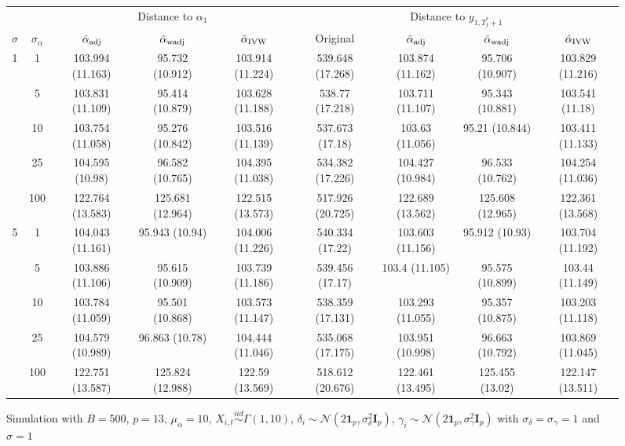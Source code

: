 \documentclass[10pt]{article}
\newcommand{\simiid}{\stackrel{iid}{\sim}} %
\def\normal#1#2{\mathcal{N}(#1,#2)} %
\theoremstyle{definition}
\begin{document}

\begin{sidewaysfigure}
\centering
\caption{Simulation  with $B = 500$, $p = 13$, $\mu_{\alpha}=10$, $X_{i,t} \simiid \Gamma(1,10)$, $\delta_i \sim \normal{2\mathbf{1}_p}{\sigma^2_{\delta}\mathbf{I}_p}$, $\gamma_i \sim \normal{2\mathbf{1}_p}{\sigma^2_{\gamma}\mathbf{I}_p}$ with $\sigma_{\delta}=\sigma_{\gamma}=1$ and $\sigma = 1$}
\begin{tabular}{cc|ccc|cccc}
  & & \multicolumn{3}{c|}{Distance to $\alpha_1$}  & \multicolumn{4}{c}{Distance to $y_{1, T_1^*+1}$}  \\ 
  $\sigma$   & $\sigma_{\alpha}$ & $\hat{\alpha}_{\rm adj}$  & $\hat{\alpha}_{\rm wadj}$ & $\hat{\alpha}_{\rm IVW}$ & Original & $\hat{\alpha}_{\rm adj}$ & $\hat{\alpha}_{\rm wadj}$ & $\hat{\alpha}_{\rm IVW}$\\[.3cm]  
  \hline
  \multirow{5}{*}{1} & 1 & 103.994 (11.163) & 95.732 (10.912) & 103.914 (11.224) & 539.648 (17.268) & 103.874 (11.162) & 95.706 (10.907) & 103.829 (11.216) \\ 
  & 5 & 103.831 (11.109) & 95.414 (10.879) & 103.628 (11.188) & 538.77 (17.218) & 103.711 (11.107) & 95.343 (10.881) & 103.541 (11.18) \\ 
  & 10 & 103.754 (11.058) & 95.276 (10.842) & 103.516 (11.139) & 537.673 (17.18) & 103.63 (11.056) & 95.21 (10.844) & 103.411 (11.133) \\ 
  & 25 & 104.595 (10.98) & 96.582 (10.765) & 104.395 (11.038) & 534.382 (17.226) & 104.427 (10.984) & 96.533 (10.762) & 104.254 (11.036) \\ 
  & 100 & 122.764 (13.583) & 125.681 (12.964) & 122.515 (13.573) & 517.926 (20.725) & 122.689 (13.562) & 125.608 (12.965) & 122.361 (13.568) \\[.3cm]  
  \multirow{5}{*}{5} & 1 & 104.043 (11.161) & 95.943 (10.94) & 104.006 (11.226) & 540.334 (17.22) & 103.603 (11.156) & 95.912 (10.93) & 103.704 (11.192) \\ 
  & 5 & 103.886 (11.106) & 95.615 (10.909) & 103.739 (11.186) & 539.456 (17.17) & 103.4 (11.105) & 95.575 (10.899) & 103.44 (11.149) \\ 
  & 10 & 103.784 (11.059) & 95.501 (10.868) & 103.573 (11.147) & 538.359 (17.131) & 103.293 (11.055) & 95.357 (10.875) & 103.203 (11.118) \\ 
  & 25 & 104.579 (10.989) & 96.863 (10.78) & 104.444 (11.046) & 535.068 (17.175) & 103.951 (10.998) & 96.663 (10.792) & 103.869 (11.045) \\ 
  & 100 & 122.751 (13.587) & 125.824 (12.988) & 122.59 (13.569) & 518.612 (20.676) & 122.461 (13.495) & 125.455 (13.02) & 122.147 (13.511) \\[.3cm]  

\end{tabular}
\end{sidewaysfigure}
\end{document}
